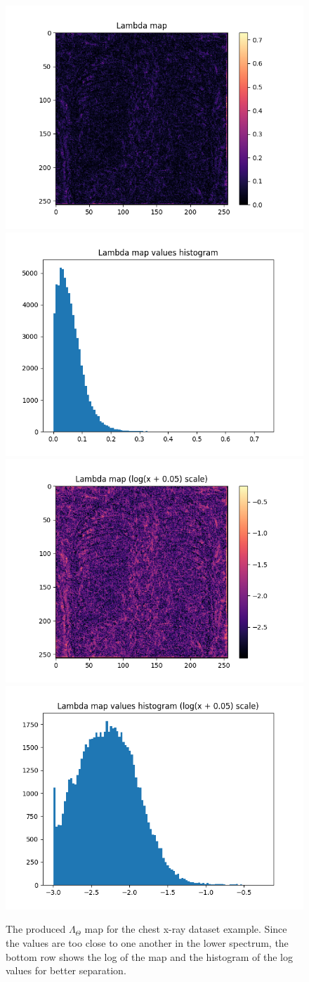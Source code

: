 \documentclass[12pt]{article}
\begin{document}
\begin{figure}[h]
  \centering
  \includegraphics[width=0.48\linewidth]{images//chest_xray/ex_31/lambda_map.png}
  \includegraphics[width=0.48\linewidth]{images//chest_xray/ex_31/lambda_map_values_histogram.png}
  \includegraphics[width=0.48\linewidth]{images//chest_xray/ex_31/lambda_map_log.png}
  \includegraphics[width=0.48\linewidth]{images//chest_xray/ex_31/lambda_map_values_histogram_log.png}
  \caption{The produced $\Lambda_{\Theta}$ map for the chest x-ray dataset example. Since the values are too close to one another in the lower spectrum, the bottom row shows the log of the map and the histogram of the log values for better separation.}
  \label{fig:enter-label}
\end{figure}
\end{document}
